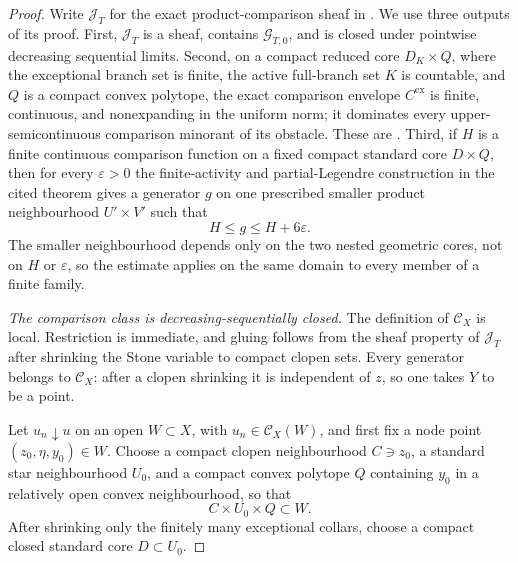 \begin{proof}
Write $\mathcal J_T$ for the exact product-comparison sheaf in
.  We use three outputs
of its proof.  First, $\mathcal J_T$ is a sheaf, contains
$\mathcal G_{T,0}$, and is closed under pointwise decreasing sequential
limits.  Second, on a compact reduced core $D_K\times Q$, where the
exceptional branch set is finite, the active full-branch set $K$ is
countable, and $Q$ is a compact convex polytope, the exact comparison
envelope $C^{\mathrm{ex}}$ is finite, continuous, and nonexpanding in the
uniform norm; it dominates every upper-semicontinuous comparison minorant
of its obstacle.  These are
.
Third, if $H$ is a finite continuous comparison function on a fixed
compact standard core $D\times Q$, then for every $\varepsilon>0$ the
finite-activity and partial-Legendre construction in the cited theorem
gives a generator $g$ on one prescribed smaller product neighbourhood
$U'\times V'$ such that
\begin{equation}
                         H\leq g\leq H+6\varepsilon.
 \label{eq:p071-stone-infinite-polyhedral-one-step}
\end{equation}
The smaller neighbourhood depends only on the two nested geometric cores,
not on $H$ or $\varepsilon$, so the estimate applies on the same domain to
every member of a finite family.

\medskip\noindent
\emph{The comparison class is decreasing-sequentially closed.}
The definition of $\mathcal C_X$ is local.  Restriction is immediate, and
gluing follows from the sheaf property of $\mathcal J_T$ after shrinking
the Stone variable to compact clopen sets.  Every generator belongs to
$\mathcal C_X$: after a clopen shrinking it is independent of $z$, so one
takes $Y$ to be a point.

Let $u_n\downarrow u$ on an open $W\subset X$, with
$u_n\in\mathcal C_X(W)$, and first fix a node point
$(z_0,\eta,y_0)\in W$.  Choose a compact clopen neighbourhood
$C\ni z_0$, a standard star neighbourhood $U_0$, and a compact convex
polytope $Q$ containing $y_0$ in a relatively open convex neighbourhood,
so that
\[
                         C\times U_0\times Q\subset W.
\]
After shrinking only the finitely many exceptional collars, choose a
compact closed standard core $D\subset U_0$.


\end{proof}
